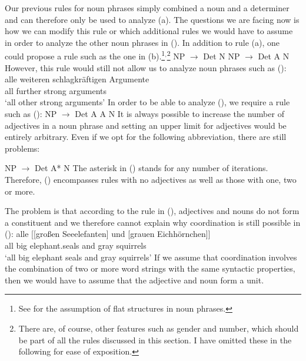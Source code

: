 Our previous rules for noun phrases simply combined a noun and a determiner and can therefore only be used to
analyze (a). The questions we are facing now is how we can modify this rule or which additional rules we would
have to assume in order to analyze the other noun phrases in (). In addition to rule (a), one could propose 
a rule such as the one in (b).\footnote{%
	See  for the assumption of flat structures in noun phrases.
}$^,$\footnote{%
	There are, of course, other features such as gender and number, which should be part of all the rules
	discussed in this section. I have omitted these in the following for ease of exposition.
}
\eal
\ex NP $\to$ Det N
\ex NP $\to$ Det A N
\zl
\largerpage[2]
However, this rule would still not allow us to analyze noun phrases such as ():
\ea
\label{Beispiel-alle-weitern-schlagkraeftigen-Argumente}
\gll alle weiteren schlagkräftigen Argumente\\
     all further strong arguments\\
\glt `all other strong arguments'
\z
In order to be able to analyze (), we require a rule such as (): 
\ea 
NP $\to$ Det A A N
\z
It is always possible to increase the number of adjectives in a noun phrase and setting an upper limit for
adjectives would be entirely arbitrary. Even if we opt for the following abbreviation, there are still problems:

\ea 
NP $\to$ Det A* N
\z
The asterisk\is{*} in () stands for any number of iterations. Therefore, () encompasses rules with no adjectives
as well as those with one, two or more.

The problem is that according to the rule in (), adjectives and nouns do not form a constituent and we therefore cannot explain why coordination 
is still possible in ():
\ea
\label{ex-alle-grossen-Seeelefanten-und}
\gll alle [[großen Seeelefanten] und [grauen Eichhörnchen]]\\
     all  \spacebr{}\spacebr{}big elephant.seals and  \spacebr{}gray squirrels\\
\glt `all big elephant seals and gray squirrels'	 
\z
If we assume that coordination involves the combination of two or more word strings with the same syntactic properties, then we would have to assume
that the adjective and noun form a unit.

